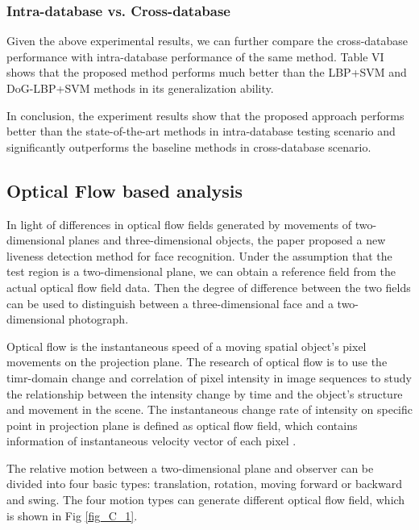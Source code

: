 \documentclass[journal]{IEEEtran}
\begin{document}
\subsubsection{Intra-database vs. Cross-database}
Given the above experimental results, we can further compare the cross-database performance with intra-database performance of the same method. Table VI shows that the proposed method performs much better than the LBP+SVM and DoG-LBP+SVM methods in its generalization ability.

In conclusion, the experiment results show that the proposed approach performs better than the state-of-the-art methods in intra-database testing scenario and significantly outperforms the baseline methods in cross-database scenario.
\subsection{Optical Flow based analysis}

In light of differences in optical flow fields generated by movements of two-dimensional planes and three-dimensional objects, the paper \cite{Bao2009A} proposed a new liveness detection method for face recognition. Under the assumption that the test region is a two-dimensional plane, we can obtain a reference field from the actual optical flow field data. Then the degree of difference between the two fields can be used to distinguish between a three-dimensional face and a two-dimensional photograph.

Optical flow is the instantaneous speed of a moving spatial object's pixel movements on the projection plane. The research of optical flow is to use the timr-domain change and correlation of pixel intensity in image sequences to study the relationship between the intensity change by time and the object's structure and movement in the scene. The instantaneous change rate of intensity on specific point in projection plane is defined as optical flow field, which contains information of instantaneous velocity vector of each pixel \cite{Barron1994Performance}.

The relative motion between a two-dimensional plane and observer can be divided into four basic types: translation, rotation, moving forward or backward and swing. The four motion types can generate different optical flow field, which is shown in Fig \ref{fig_C_1}.
\end{document}

